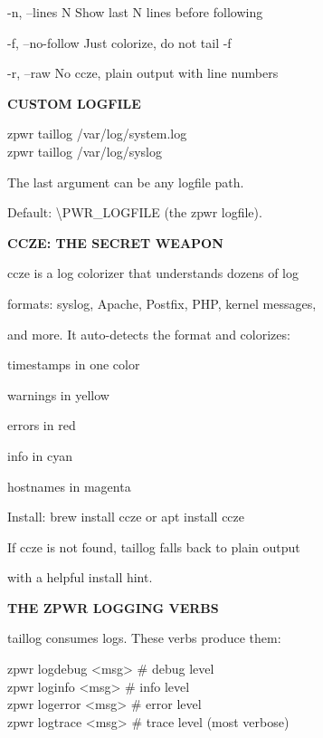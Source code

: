 \documentclass[11pt,a4paper,twoside]{book}
\begin{document}
-n, --lines N     Show last N lines before following

-f, --no-follow   Just colorize, do not tail -f

-r, --raw         No ccze, plain output with line numbers


\vspace{12pt}
{\bfseries\color{neonyellow} CUSTOM LOGFILE}\vspace{4pt}

\begin{codebox}
zpwr taillog /var/log/system.log\\
zpwr taillog /var/log/syslog\\
\end{codebox}

The last argument can be any logfile path.

Default: \textbackslash{}PWR\_LOGFILE (the zpwr logfile).


\vspace{12pt}
{\bfseries\color{neonyellow} CCZE: THE SECRET WEAPON}\vspace{4pt}

ccze is a log colorizer that understands dozens of log

formats: syslog, Apache, Postfix, PHP, kernel messages,

and more. It auto-detects the format and colorizes:

timestamps     in one color

warnings       in yellow

errors         in red

info           in cyan

hostnames      in magenta

\begin{codebox}
Install: brew install ccze  or  apt install ccze\\
\end{codebox}

If ccze is not found, taillog falls back to plain output

with a helpful install hint.


\vspace{12pt}
{\bfseries\color{neonyellow} THE ZPWR LOGGING VERBS}\vspace{4pt}

taillog consumes logs. These verbs produce them:

\begin{codebox}
zpwr logdebug <msg>                 \# debug level\\
zpwr loginfo <msg>                  \# info level\\
zpwr logerror <msg>                 \# error level\\
zpwr logtrace <msg>                 \# trace level (most verbose)\\
\end{codebox}
\end{document}
